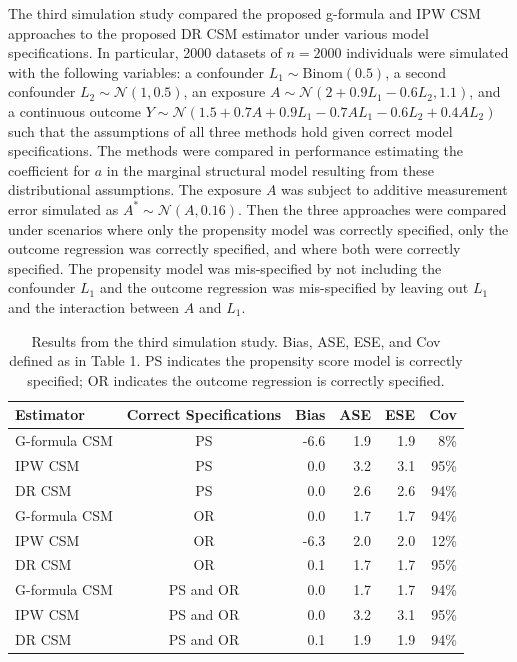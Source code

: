 \documentclass[useAMS,usenatbib,referee]{biom}
\begin{document}
The third simulation study compared the proposed g-formula and IPW CSM approaches to the proposed DR CSM estimator under various model specifications. In particular, 2000 datasets of $n = 2000$ individuals were simulated with the following variables: a confounder $L_{1} \sim \text{Binom}(0.5)$, a second confounder $L_{2} \sim \mathcal{N}(1, 0.5)$, an exposure $A \sim \mathcal{N}(2 + 0.9L_{1} - 0.6L_{2}, 1.1)$, and a continuous outcome $Y \sim \mathcal{N}(1.5 + 0.7A + 0.9L_{1} - 0.7AL_{1} - 0.6L_{2} + 0.4AL_{2})$ such that the assumptions of all three methods hold given correct model specifications. The methods were compared in performance estimating the coefficient for $a$ in the marginal structural model resulting from these distributional assumptions. The exposure $A$ was subject to additive measurement error simulated as $A^{*} \sim \mathcal{N}(A, 0.16)$. Then the three approaches were compared under scenarios where only the propensity model was correctly specified, only the outcome regression was correctly specified, and where both were correctly specified. The propensity model was mis-specified by not including the confounder $L_{1}$ and the outcome regression was mis-specified by leaving out $L_{1}$ and the interaction between $A$ and $L_{1}$.

\begin{table}[]
    \centering
    \caption{Results from the third simulation study. Bias, ASE, ESE, and Cov defined as in Table 1. PS indicates the propensity score model is correctly specified; OR indicates the outcome regression is correctly specified.}
    \begin{tabular}{lcrrrr}
    \hline
         Estimator & Correct Specifications & Bias & ASE & ESE & Cov \\
         \hline
G-formula CSM & PS & -6.6 & 1.9 & 1.9 & 8\% \\
IPW CSM & PS & 0.0 & 3.2 & 3.1 & 95\% \\
DR CSM & PS & 0.0 & 2.6 & 2.6 & 94\% \\[4pt]
G-formula CSM & OR & 0.0 & 1.7 & 1.7 & 94\% \\
IPW CSM & OR & -6.3 & 2.0 & 2.0 & 12\% \\
DR CSM & OR & 0.1 & 1.7 & 1.7 & 95\% \\[4pt]
G-formula CSM & PS and OR & 0.0 & 1.7 & 1.7 & 94\% \\
IPW CSM & PS and OR & 0.0 & 3.2 & 3.1 & 95\% \\
DR CSM & PS and OR & 0.1 & 1.9 & 1.9 & 94\% \\
         \hline
    \end{tabular}
    \label{tab:three}
\end{table}
\end{document}
